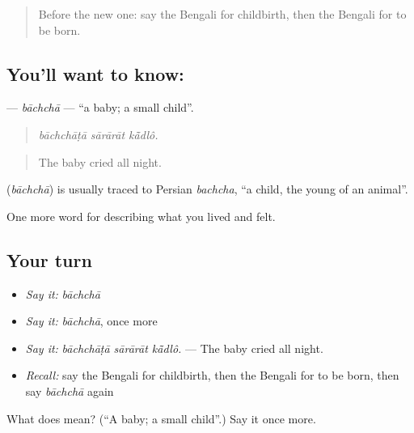 \label{lesson:BN-C485-bachcha}



\begin{quote}
Before the new one: say the Bengali for childbirth, then the Bengali for to be born.
\end{quote}

\subsection*{You'll want to know: }
\textbf{} — \emph{bāchchā} — \textquotedblleft{}a baby; a small child\textquotedblright{}.

\begin{quote}
  
\end{quote}

\begin{quote}
\emph{bāchchāṭā sārārāt kā̃dlô.}
\end{quote}

\begin{quote}
The baby cried all night.
\end{quote}

\begin{cousinweb}
\textbf{} (\emph{bāchchā}) is usually traced to Persian \emph{bachcha}, \textquotedblleft{}a child, the young of an animal\textquotedblright{}.
\end{cousinweb}

\begin{grammarlens}[title={What you've built}]
One more word for describing what you lived and felt.
\end{grammarlens}

\subsection*{Your turn}
\begin{itemize}
\raggedright
  \item \emph{Say it:} \emph{bāchchā}
  \item \emph{Say it:} \emph{bāchchā}, once more
  \item \emph{Say it:} \emph{bāchchāṭā sārārāt kā̃dlô.} — The baby cried all night.
  \item \emph{Recall:} say the Bengali for childbirth, then the Bengali for to be born, then say \emph{bāchchā} again
\end{itemize}

\begin{tcolorbox}[breakable,colback=teal!4,colframe=teal!35!black,title={Before you move on}]
What does  mean? (\textquotedblleft{}A baby; a small child\textquotedblright{}.) Say it once more.
\end{tcolorbox}

